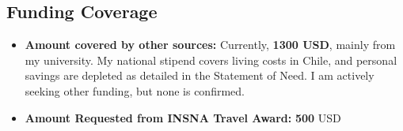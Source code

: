 \subsection{Funding Coverage}
\vspace{0.5cm}

\begin{itemize}
    \item \textbf{Amount covered by other sources:} Currently, \textbf{1300 USD}, mainly from my university. My national stipend covers living costs in Chile, and personal savings are depleted as detailed in the Statement of Need. I am actively seeking other funding, but none is confirmed.
    \item \textbf{Amount Requested from INSNA Travel Award:} \textbf{500} USD
\end{itemize}

\vspace{0.5cm}

